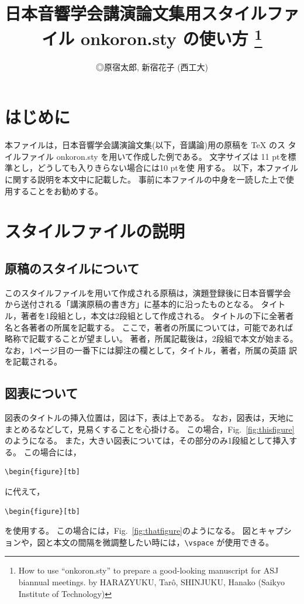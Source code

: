 \documentclass[10pt,twocolumn]{jarticle} %
\title{日本音響学会講演論文集用スタイルファイル onkoron.sty の使い方
\thanks{How to use ``onkoron.sty'' to prepare a good-looking
manuscript for ASJ biannual meetings. by HARAZYUKU, Tar\^o, SHINJUKU,
Hanako (Saikyo Institute of Technology)}
}
\author{◎原宿太郎, 新宿花子 (西工大)}
\begin{document}
\maketitle   

\section{はじめに}

本ファイルは，日本音響学会講演論文集(以下，音講論)用の原稿を TeX のス
タイルファイル onkoron.sty を用いて作成した例である。
文字サイズは 11 ptを標準とし，どうしても入りきらない場合には10 ptを使
用する。
以下，本ファイルに関する説明を本文中に記載した。
事前に本ファイルの中身を一読した上で使用することをお勧めする。

\section{スタイルファイルの説明}

\subsection{原稿のスタイルについて}

このスタイルファイルを用いて作成される原稿は，演題登録後に日本音響学会
から送付される「講演原稿の書き方」に基本的に沿ったものとなる。
タイトル，著者を1段組とし，本文は2段組として作成される。
タイトルの下に全著者名と各著者の所属を記載する。
ここで，著者の所属については，可能であれば略称で記載することが望ましい。
著者，所属記載後は，2段組で本文が始まる。
なお，1ページ目の一番下には脚注の欄として，タイトル，著者，所属の英語
訳を記載される。

\subsection{図表について}

図表のタイトルの挿入位置は，図は下，表は上である。
なお，図表は，天地にまとめるなどして，見易くすることを心掛ける。
この場合，Fig.~\ref{fig:thisfigure}のようになる。
また，大きい図表については，その部分のみ1段組として挿入する。
この場合には，
\begin{verbatim}
\begin{figure}[tb]
\end{verbatim}
に代えて，
\begin{verbatim}
\begin{figure}[tb]
\end{verbatim}
を使用する。
この場合には，Fig.~\ref{fig:thatfigure}のようになる。
図とキャプションや，図と本文の間隔を微調整したい時には，\verb|\vspace|
が使用できる。
\end{document}
